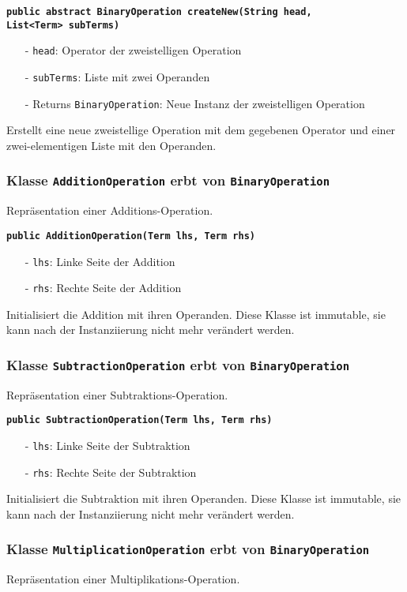 \documentclass[parskip=full,11pt,twoside]{scrartcl}
\begin{document}
\textbf{\texttt{public abstract BinaryOperation createNew(String head,\\List<Term> subTerms)}}
\begin{itemize}[noitemsep]
	\item[-] \texttt{head}: Operator der zweistelligen Operation
	\item[-] \texttt{subTerms}: Liste mit zwei Operanden
	\item[-] Returns \texttt{BinaryOperation}: Neue Instanz der zweistelligen Operation
\end{itemize}
Erstellt eine neue zweistellige Operation mit dem gegebenen Operator und einer zwei-elementigen Liste mit den Operanden.

\subsubsection{Klasse \texttt{AdditionOperation} erbt von \texttt{BinaryOperation}}
Repräsentation einer Additions-Operation.

\textbf{\texttt{public AdditionOperation(Term lhs, Term rhs)}}
\begin{itemize}[noitemsep]
	\item[-] \texttt{lhs}: Linke Seite der Addition
	\item[-] \texttt{rhs}: Rechte Seite der Addition
\end{itemize}
Initialisiert die Addition mit ihren Operanden. Diese Klasse ist immutable, sie kann nach der Instanziierung nicht mehr verändert werden.

\subsubsection{Klasse \texttt{SubtractionOperation} erbt von \texttt{BinaryOperation}}
Repräsentation einer Subtraktions-Operation.

\textbf{\texttt{public SubtractionOperation(Term lhs, Term rhs)}}
\begin{itemize}[noitemsep]
	\item[-] \texttt{lhs}: Linke Seite der Subtraktion
	\item[-] \texttt{rhs}: Rechte Seite der Subtraktion
\end{itemize}
Initialisiert die Subtraktion mit ihren Operanden. Diese Klasse ist immutable, sie kann nach der Instanziierung nicht mehr verändert werden.

\subsubsection{Klasse \texttt{MultiplicationOperation} erbt von \texttt{BinaryOperation}}
Repräsentation einer Multiplikations-Operation.
\end{document}
